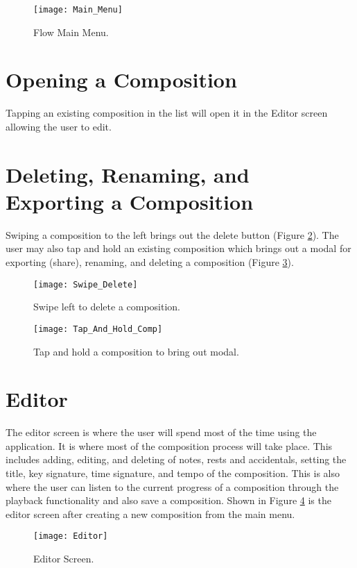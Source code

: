 \begin{figure}[H]
  \centering
  \texttt{[image: Main\_Menu]}
    \caption{Flow Main Menu.}
    \label{fig:main-menu}
\end{figure}

\section{Opening a Composition}
Tapping an existing composition in the list will open it in the Editor screen allowing the user to edit. 

\section{Deleting, Renaming, and Exporting a Composition}
Swiping a composition to the left brings out the delete button (Figure \ref{fig:swipe-delete}). The user may also tap and hold an existing composition which brings out a modal for exporting (share), renaming, and deleting a composition (Figure \ref{fig:tap-hold-comp}).

\begin{figure}[H]
  \centering
  \texttt{[image: Swipe\_Delete]}
    \caption{Swipe left to delete a composition.}
    \label{fig:swipe-delete}
\end{figure}

\begin{figure}[H]
  \centering
  \texttt{[image: Tap\_And\_Hold\_Comp]}
    \caption{Tap and hold a composition to bring out modal.}
    \label{fig:tap-hold-comp}
\end{figure}

\section{Editor}

The editor screen is where the user will spend most of the time using the application. It is where most of the composition process will take place. This includes adding, editing, and deleting of notes, rests and accidentals, setting the title, key signature, time signature, and tempo of the composition. This is also where the user can listen to the current progress of a composition through the playback functionality and also save a composition. Shown in Figure \ref{fig:editor} is the editor screen after creating a new composition from the main menu. 

\begin{figure}[H]
  \centering
  \texttt{[image: Editor]}
    \caption{Editor Screen.}
    \label{fig:editor}
\end{figure}


